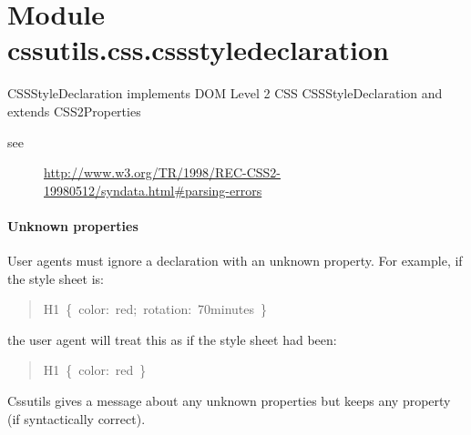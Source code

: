 %
%
%


\section{Module cssutils.css.cssstyledeclaration}

    \label{cssutils:css:cssstyledeclaration}

CSSStyleDeclaration implements DOM Level 2 CSS CSSStyleDeclaration and
extends CSS2Properties
\begin{description}
\item[{see}] \leavevmode 
\href{http://www.w3.org/TR/1998/REC-CSS2-19980512/syndata.html\#parsing-errors}{http://www.w3.org/TR/1998/REC-CSS2-19980512/syndata.html{\#}parsing-errors}

\end{description}



\hypertarget{unknown-properties}{}
\paragraph*{Unknown properties}
\label{unknown-properties}

User agents must ignore a declaration with an unknown property.
For example, if the style sheet is:
\begin{quote}{\ttfamily \raggedright \noindent
H1~{\{}~color:~red;~rotation:~70minutes~{\}}
}\end{quote}

the user agent will treat this as if the style sheet had been:
\begin{quote}{\ttfamily \raggedright \noindent
H1~{\{}~color:~red~{\}}
}\end{quote}

Cssutils gives a message about any unknown properties but
keeps any property (if syntactically correct).


